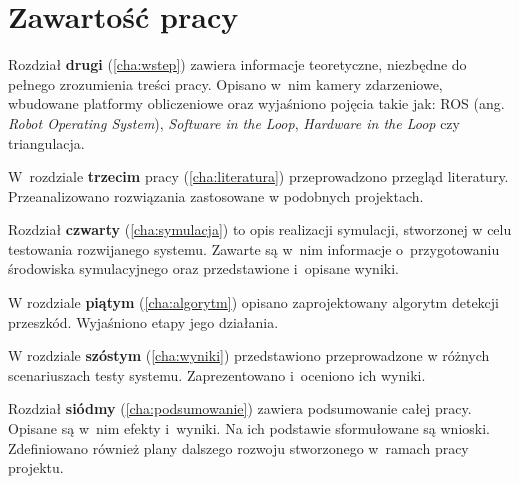 
\section{Zawartość pracy}
\label{sec:zawartoscPracy}

Rozdział \textbf{drugi} (\ref{cha:wstep}) zawiera informacje teoretyczne, niezbędne do pełnego zrozumienia treści pracy. Opisano w~nim kamery zdarzeniowe, wbudowane platformy obliczeniowe oraz wyjaśniono pojęcia takie jak: ROS (ang. \textit{Robot Operating System}), \textit{Software in the Loop}, \textit{Hardware in the Loop} czy triangulacja.

W~rozdziale \textbf{trzecim} pracy (\ref{cha:literatura}) przeprowadzono przegląd literatury. Przeanalizowano rozwiązania zastosowane w podobnych projektach.

Rozdział \textbf{czwarty} (\ref{cha:symulacja}) to opis realizacji symulacji, stworzonej w celu testowania rozwijanego systemu. Zawarte są w~nim informacje o~przygotowaniu środowiska symulacyjnego oraz przedstawione i~opisane wyniki.

W rozdziale \textbf{piątym} (\ref{cha:algorytm}) opisano zaprojektowany algorytm detekcji przeszkód. Wyjaśniono etapy jego działania.

W rozdziale \textbf{szóstym} (\ref{cha:wyniki}) przedstawiono przeprowadzone w różnych scenariuszach testy systemu. Zaprezentowano i~oceniono ich wyniki.

Rozdział \textbf{siódmy} (\ref{cha:podsumowanie}) zawiera podsumowanie całej pracy. Opisane są w~nim efekty i~wyniki. Na ich podstawie sformułowane są wnioski. Zdefiniowano również plany dalszego rozwoju stworzonego w~ramach pracy projektu.

